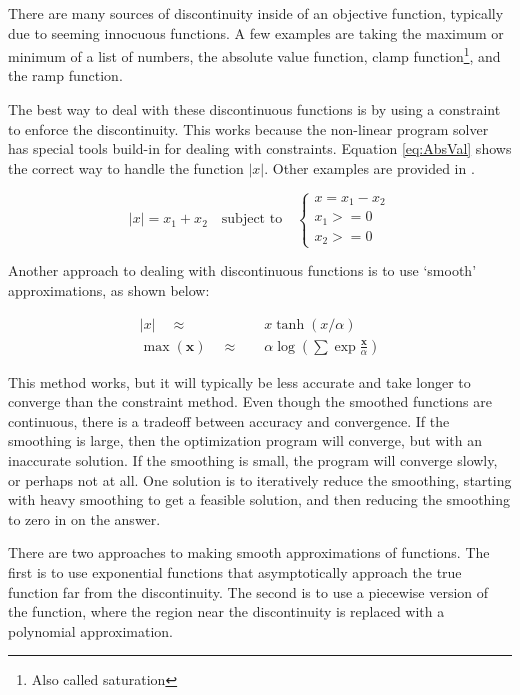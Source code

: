 There are many sources of discontinuity inside of an objective function, typically due to seeming innocuous functions. A few examples are taking the maximum or minimum of a list of numbers, the absolute value function, clamp function\footnote{Also called saturation}, and the ramp function.

\par The best way to deal with these discontinuous functions is by using a constraint to enforce the discontinuity. This works because the non-linear program solver has special tools build-in for dealing with constraints. Equation \ref{eq:AbsVal} shows the correct way to handle the function $|x|$. Other examples are provided in \cite{JohnT.Betts2001}.

\begin{equation} \label{eq:AbsVal}
|x| = x_1 + x_2 \quad \text{subject to} \quad

  \begin{cases}
	x=x_1-x_2 \\
	x_1>=0 \\ 
	x_2>=0	
  \end{cases}
\end{equation}

\par Another approach to dealing with discontinuous functions is to use `smooth' approximations, as shown below:

\begin{align*}
|x| \quad \approx \quad & x \tanh \left(x / \alpha \right) \\
\max(\mathbf{x}) \quad \approx \quad &  \alpha \log\left(\sum \exp \frac{\mathbf{x}}{\alpha} \right)
\end{align*}

\par This method works, but it will typically be less accurate and take longer to converge than the constraint method. Even though the smoothed functions are continuous, there is a tradeoff between accuracy and convergence. If the smoothing is large, then the optimization program will converge, but with an inaccurate solution. If the smoothing is small, the program will converge slowly, or perhaps not at all. One solution is to iteratively reduce the smoothing, starting with heavy smoothing to get a feasible solution, and then reducing the smoothing to zero in on the answer. 

\par There are two approaches to making smooth approximations of functions. The first is to use exponential functions that asymptotically approach the true function far from the discontinuity. The second is to use a piecewise version of the function, where the region near the discontinuity is replaced with a polynomial approximation. 


